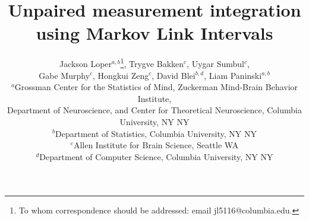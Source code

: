 \documentclass{article}
\newcommand{\blind}[2]{#1}
\theoremstyle{definition}
\begin{document}
\title{Unpaired measurement integration using Markov Link Intervals}

\author{\blind{Jackson Loper$^{a,b}$\footnote{To whom correspondence should be addressed: email jl5116@columbia.edu.}, Trygve Bakken$^c$, Uygar Sumbul$^c$, \\ Gabe Murphy$^c$, Hongkui Zeng$^c$, David Blei$^{b,d}$, Liam Paninski$^{a,b}$ \\
\small $^a$Grossman Center for the Statistics of Mind, Zuckerman Mind-Brain Behavior Institute, \\ \small Department of Neuroscience, and Center for Theoretical Neuroscience, Columbia University, NY NY \\
\small $^b$Department of Statistics, Columbia University, NY NY \\
\small $^c$Allen Institute for Brain Science, Seattle WA \\
\small $^d$Department of Computer Science, Columbia University, NY NY}{[Authors blinded]}}

\maketitle

\end{document}
